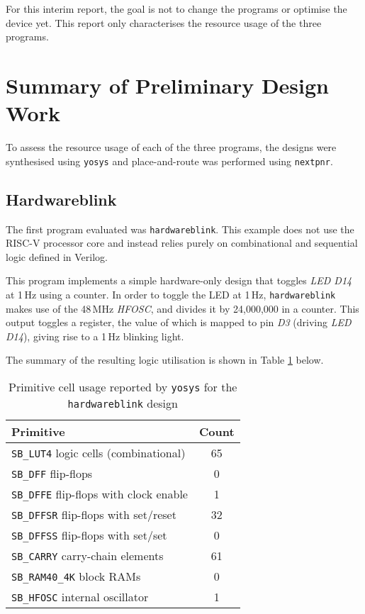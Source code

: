 \documentclass[a4paper,10pt]{article}
\begin{document}
For this interim report, the goal is not to 
change the programs or optimise the device yet.
This report only characterises the resource usage of the three programs.


\section{Summary of Preliminary Design Work}
\label{sec:Summary_of_Preliminary_Design_Work}

To assess the resource usage of each of the three programs, 
the designs were synthesised using \texttt{yosys} 
and place-and-route was performed using \texttt{nextpnr}. 

\subsection{Hardwareblink}
\label{sec:Hardwareblink}

The first program evaluated was \texttt{hardwareblink}.
This example does not use the RISC-V processor core and 
instead relies purely on combinational and sequential logic defined in Verilog.

This program implements a simple hardware-only design that 
toggles \textit{LED D14} at 1\,Hz using a counter. 
In order to toggle the LED at 1\,Hz, 
\texttt{hardwareblink} makes use of the 48\,MHz \textit{HFOSC},
and divides it by 24,000,000 in a counter.
This output toggles a register, 
the value of which is mapped to pin \textit{D3} (driving \textit{LED D14}),
giving rise to a 1\,Hz blinking light.

The summary of the resulting logic utilisation is shown
in Table \ref{tab:hardware_yosys_report} below.

\begin{table}[H]
    \centering
    \begin{tabular}{|l|c|}
        \hline
        \textbf{Primitive} & \textbf{Count} \\
        \hline
        \texttt{SB\_LUT4} logic cells (combinational) & 65 \\
        \texttt{SB\_DFF} flip-flops & 0 \\
        \texttt{SB\_DFFE} flip-flops with clock enable & 1 \\
        \texttt{SB\_DFFSR} flip-flops with set/reset & 32 \\
        \texttt{SB\_DFFSS} flip-flops with set/set & 0 \\
        \texttt{SB\_CARRY} carry-chain elements & 61 \\
        \texttt{SB\_RAM40\_4K} block RAMs & 0 \\
        \texttt{SB\_HFOSC} internal oscillator & 1 \\
        \hline
    \end{tabular}
    \caption{Primitive cell usage reported by \texttt{yosys} for the \texttt{hardwareblink} design}
    \label{tab:hardware_yosys_report}
\end{table}
\end{document}
